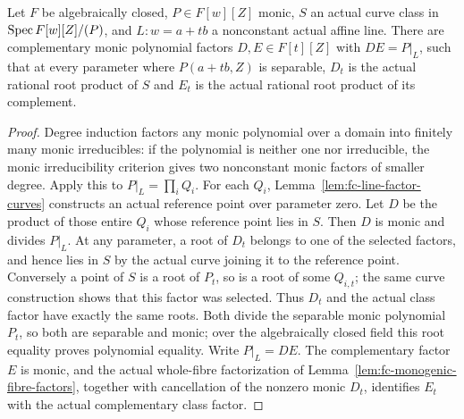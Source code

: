 \begin{lemma}\label{lem:fc-monogenic-line-factors}
\leanok
{}
Let $F$ be algebraically closed, $P\in F[w][Z]$ monic, $S$ an actual curve class in $\operatorname{Spec} F[w][Z]/(P)$,
and $L\colon w=a+tb$ a nonconstant actual affine line. There are complementary monic polynomial factors
$D,E\in F[t][Z]$ with $DE=P|_L$, such that at every parameter where $P(a+tb,Z)$ is separable, $D_t$ is the
actual rational root product of $S$ and $E_t$ is the actual rational root product of its complement.
\end{lemma}

\begin{proof}
Degree induction factors any monic polynomial over a domain into finitely many monic irreducibles:
if the polynomial is neither one nor irreducible, the monic irreducibility criterion gives two nonconstant
monic factors of smaller degree. Apply this to $P|_L=\prod_iQ_i$.
For each $Q_i$, Lemma~\ref{lem:fc-line-factor-curves} constructs an actual reference point over parameter zero.
Let $D$ be the product of those entire $Q_i$ whose reference point lies in $S$. Then $D$ is monic and divides
$P|_L$. At any parameter, a root of $D_t$ belongs to one of the selected factors, and hence lies in $S$ by the
actual curve joining it to the reference point. Conversely a point of $S$ is a root of $P_t$, so is a root of
some $Q_{i,t}$; the same curve construction shows that this factor was selected. Thus $D_t$ and the actual
class factor have exactly the same roots. Both divide the separable monic polynomial $P_t$, so both are
separable and monic; over the algebraically closed field this root equality proves polynomial equality.
Write $P|_L=DE$. The complementary factor $E$ is monic, and the actual whole-fibre factorization of
Lemma~\ref{lem:fc-monogenic-fibre-factors}, together with cancellation of the nonzero monic $D_t$, identifies
$E_t$ with the actual complementary class factor.
\end{proof}

